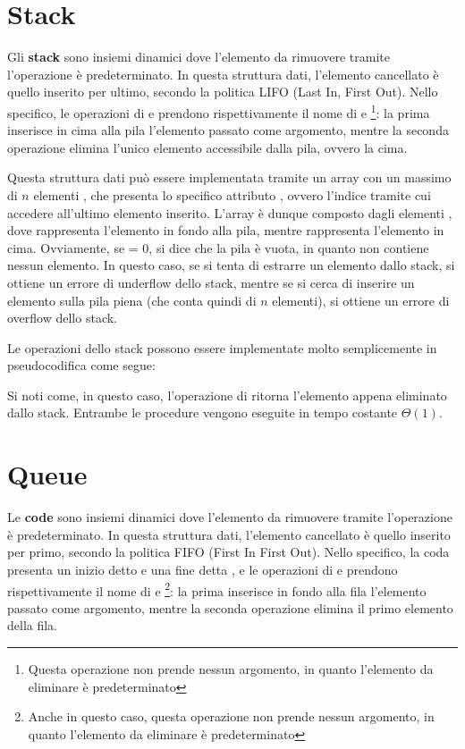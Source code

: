\section{Stack}
Gli \textbf{stack} sono insiemi dinamici dove l'elemento da rimuovere tramite l'operazione  è predeterminato. In questa struttura dati, l'elemento cancellato è quello inserito per ultimo, secondo la politica LIFO (Last In, First Out). Nello specifico, le operazioni di  e  prendono rispettivamente il nome di  e  \footnote{Questa operazione non prende nessun argomento, in quanto l'elemento da eliminare è predeterminato}: la prima inserisce in cima alla pila l'elemento passato come argomento, mentre la seconda operazione elimina l'unico elemento accessibile dalla pila, ovvero la cima. 

Questa struttura dati può essere implementata tramite un array con un massimo di \(n\) elementi , che presenta lo specifico attributo , ovvero l'indice tramite cui accedere all'ultimo elemento inserito. L'array è dunque composto dagli elementi , dove  rappresenta l'elemento in fondo alla pila, mentre  rappresenta l'elemento in cima. Ovviamente, se  = 0, si dice che la pila è vuota, in quanto non contiene nessun elemento. In questo caso, se si tenta di estrarre un elemento dallo stack, si ottiene un errore di underflow dello stack, mentre se si cerca di inserire un elemento sulla pila piena (che conta quindi di \(n\) elementi), si ottiene un errore di overflow dello stack.

Le operazioni dello stack possono essere implementate molto semplicemente in pseudocodifica come segue:




Si noti come, in questo caso, l'operazione di  ritorna l'elemento appena eliminato dallo stack. Entrambe le procedure vengono eseguite in tempo costante \(\Theta(1)\).

\section{Queue}
Le \textbf{code} sono insiemi dinamici dove l'elemento da rimuovere tramite l'operazione  è predeterminato. In questa struttura dati, l'elemento cancellato è quello inserito per primo, secondo la politica FIFO (First In First Out). Nello specifico, la coda presenta un inizio detto  e una fine detta , e le operazioni di  e  prendono rispettivamente il nome di  e  \footnote{Anche in questo caso, questa operazione non prende nessun argomento, in quanto l'elemento da eliminare è predeterminato}: la prima inserisce in fondo alla fila l'elemento passato come argomento, mentre la seconda operazione elimina il primo elemento della fila. 

